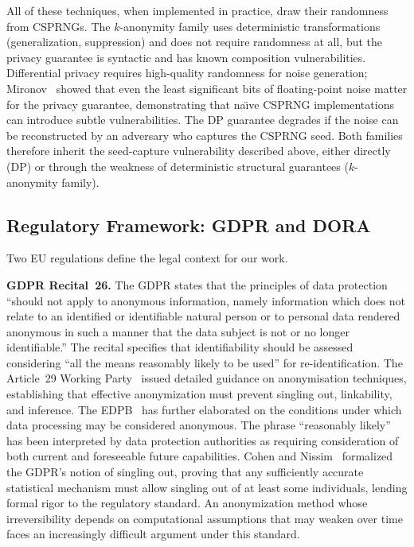 \documentclass[journal]{IEEEtran}
\begin{document}
All of these techniques, when implemented in practice, draw their randomness from CSPRNGs. The $k$-anonymity family uses deterministic transformations (generalization, suppression) and does not require randomness at all, but the privacy guarantee is syntactic and has known composition vulnerabilities. Differential privacy requires high-quality randomness for noise generation; Mironov~\cite{mironov2012significance} showed that even the least significant bits of floating-point noise matter for the privacy guarantee, demonstrating that na\"{\i}ve CSPRNG implementations can introduce subtle vulnerabilities. The DP guarantee degrades if the noise can be reconstructed by an adversary who captures the CSPRNG seed. Both families therefore inherit the seed-capture vulnerability described above, either directly (DP) or through the weakness of deterministic structural guarantees ($k$-anonymity family).

\subsection{Regulatory Framework: GDPR and DORA}
\label{subsec:gdpr}

Two EU regulations define the legal context for our work.

\textbf{GDPR Recital~26.} The GDPR states that the principles of data protection ``should not apply to anonymous information, namely information which does not relate to an identified or identifiable natural person or to personal data rendered anonymous in such a manner that the data subject is not or no longer identifiable.'' The recital specifies that identifiability should be assessed considering ``all the means reasonably likely to be used'' for re-identification. The Article~29 Working Party~\cite{art29wp2014anonymisation} issued detailed guidance on anonymisation techniques, establishing that effective anonymization must prevent singling out, linkability, and inference. The EDPB~\cite{edpb2020guidelines} has further elaborated on the conditions under which data processing may be considered anonymous. The phrase ``reasonably likely'' has been interpreted by data protection authorities as requiring consideration of both current and foreseeable future capabilities. Cohen and Nissim~\cite{cohen2020singling} formalized the GDPR's notion of singling out, proving that any sufficiently accurate statistical mechanism must allow singling out of at least some individuals, lending formal rigor to the regulatory standard. An anonymization method whose irreversibility depends on computational assumptions that may weaken over time faces an increasingly difficult argument under this standard.
\end{document}
